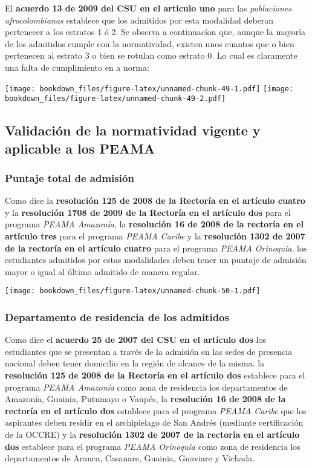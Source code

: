 \documentclass[]{article}
\theoremstyle{definition}
\theoremstyle{definition}
\theoremstyle{definition}
\theoremstyle{remark}
\begin{document}
El \textbf{acuerdo 13 de 2009 del CSU en el articulo uno} para las
\emph{poblaciones afrocolombianas} establece que los admitidos por esta
modalidad deberan pertenecer a los estratos 1 ó 2. Se observa a
continuacíon que, aunque la mayoría de los admitidos cumple con la
normatividad, existen unos cuantos que o bien pertenecen al estrato 3 o
bien se rotulan como estrato 0. Lo cual es claramente una falta de
cumplimiento en a norma:

\texttt{[image: bookdown\_files/figure-latex/unnamed-chunk-49-1.pdf]}
\texttt{[image: bookdown\_files/figure-latex/unnamed-chunk-49-2.pdf]}

\subsection{Validación de la normatividad vigente y aplicable a los
PEAMA}\label{validacion-de-la-normatividad-vigente-y-aplicable-a-los-peama}

\subsubsection{Puntaje total de
admisión}\label{puntaje-total-de-admision-1}

Como dice la \textbf{resolución 125 de 2008 de la Rectoría en el
artículo cuatro} y la \textbf{resolución 1708 de 2009 de la Rectoría en
el artículo dos} para el programa \emph{PEAMA Amazonía}, la
\textbf{resolución 16 de 2008 de la rectoría en el artículo tres} para
el programa \emph{PEAMA Caribe} y la \textbf{resolución 1302 de 2007 de
la rectoría en el artículo cuatro} para el programa \emph{PEAMA
Orinoquía}, los estudiantes admitidos por estas modalidades deben tener
un puntaje de admisión mayor o igual al último admitido de manera
regular.

\texttt{[image: bookdown\_files/figure-latex/unnamed-chunk-50-1.pdf]}

\subsubsection{Departamento de residencia de los
admitidos}\label{departamento-de-residencia-de-los-admitidos}

Como dice el \textbf{acuerdo 25 de 2007 del CSU en el artículo dos} los
estudiantes que se presentan a través de la admisión en las sedes de
presencia nacional deben tener domicilio en la región de alcance de la
misma. la \textbf{resolución 125 de 2008 de la Rectoría en el artículo
dos} establece para el programa \emph{PEAMA Amazonía} como zona de
residencia los departamentos de Amazonía, Guainia, Putumayo o Vaupés, la
\textbf{resolución 16 de 2008 de la rectoría en el artículo dos}
establece para el programa \emph{PEAMA Caribe} que los aspirantes deben
residir en el archipielago de San Andrés (mediante certificación de la
OCCRE) y la \textbf{resolución 1302 de 2007 de la rectoría en el
artículo dos} establece para el programa \emph{PEAMA Orinoquía} como
zona de residencia los departamentos de Arauca, Casanare, Guainia,
Guaviare y Vichada.
\end{document}

